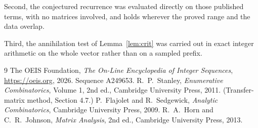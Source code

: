 \documentclass[11pt,a4paper]{article}
\theoremstyle{plain}
\theoremstyle{definition}
\begin{document}
Second, the conjectured recurrence was evaluated directly on those published terms, with no
matrices involved, and holds wherever the proved range and the data overlap.

Third, the annihilation test of Lemma~\ref{lem:crit} was carried out in exact integer
arithmetic on the whole vector rather than on a sampled prefix.

\begin{thebibliography}{9}
 The OEIS Foundation, \emph{The On-Line Encyclopedia of Integer
Sequences}, \url{https://oeis.org}, 2026. Sequence A249653.
 R.~P.~Stanley, \emph{Enumerative Combinatorics}, Volume 1, 2nd ed.,
Cambridge University Press, 2011. (Transfer-matrix method, Section 4.7.)
 P.~Flajolet and R.~Sedgewick, \emph{Analytic Combinatorics}, Cambridge
University Press, 2009.
 R.~A.~Horn and C.~R.~Johnson, \emph{Matrix Analysis}, 2nd ed., Cambridge
University Press, 2013.
\end{thebibliography}
\end{document}
